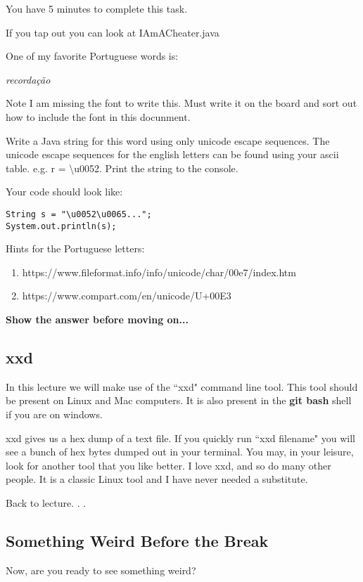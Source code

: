 \documentclass[12pt]{article}
\begin{document}
You have 5 minutes to complete this task. 

If you tap out you can look at IAmACheater.java

One of my favorite Portuguese words is:

\begin{center}
\textit{recordação} 
\end{center}

Note I am missing the font to write this. Must write it on the board and sort out how to include the font in this docunment.

Write a Java string for this word using only unicode escape sequences. The unicode escape sequences for the english letters can be found using your ascii table. e.g. r = \textbackslash u0052. Print the string to the console.

Your code should look like:

\begin{lstlisting}
String s = "\u0052\u0065...";
System.out.println(s);
\end{lstlisting}

Hints for the Portuguese letters:
\begin{enumerate}
\item https://www.fileformat.info/info/unicode/char/00e7/index.htm
\item https://www.compart.com/en/unicode/U+00E3
\end{enumerate}

\begin{center}
\textbf{Show the answer before moving on...}
\end{center}

\subsection{xxd}
In this lecture we will make use of the ``xxd" command line tool. This tool should be present on Linux and Mac computers. It is also present in the \textbf{git bash} shell if you are on windows.

xxd gives us a hex dump of a text file. If you quickly run ``xxd filename" you will see a bunch of hex bytes dumped out in your terminal. You may, in your leisure, look for another tool that you like better. I love xxd, and so do many other people. It is a classic Linux tool and I have never needed a substitute. 

Back to lecture. . .


\subsection{Something Weird Before the Break}
Now, are you ready to see something weird? 
\end{document}
